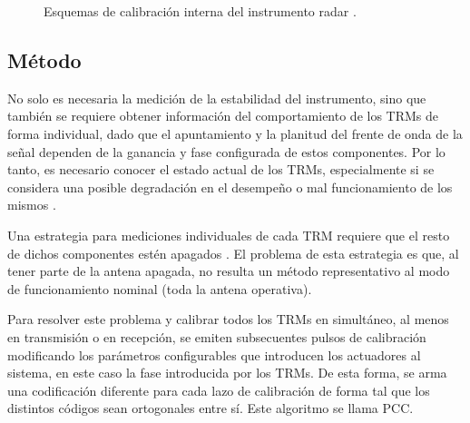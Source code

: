 \begin{figure}[H]
	\centering
	\caption{Esquemas de calibración interna del instrumento radar \cite{Curlander1991}.}
	\label{fig:calibrMethods}
\end{figure}


\subsection{Método} \label{ssc:classicalMethod}

No solo es necesaria la medición de la estabilidad del instrumento, sino que también se requiere obtener información del
comportamiento de los TRMs de forma individual, dado que el apuntamiento y la planitud del frente de onda de la señal dependen
de la ganancia y fase configurada de estos componentes. Por lo tanto, es necesario conocer el estado actual de los TRMs,
especialmente si se considera una posible degradación en el desempeño o mal funcionamiento de los mismos \cite{Br2007}.

Una estrategia para mediciones individuales de cada TRM requiere que el resto de dichos componentes estén apagados 
\cite{Br2007}. El problema de esta estrategia es que, al tener parte de la antena apagada, no resulta un método representativo
al modo de funcionamiento nominal (toda la antena operativa).

Para resolver este problema y calibrar todos los TRMs en simultáneo, al menos en transmisión o en recepción, se emiten
subsecuentes pulsos de calibración modificando los parámetros configurables que introducen los actuadores al sistema, en este
caso la fase introducida por los TRMs. De esta forma, se arma una codificación diferente para cada lazo de calibración de forma
tal que los distintos códigos sean ortogonales entre sí. Este algoritmo se llama PCC.

